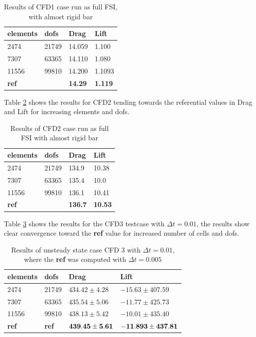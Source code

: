 \begin{table}[H]
\centering
\caption{Results of CFD1 case run as full FSI, with almost rigid bar}
\label{tab:CFD1}
\begin{tabular}{|l|l|l|l|}
\hline
\textbf{elements} & \textbf{dofs} & \textbf{Drag} & \textbf{Lift} \\ \hline
2474 & 21749 & 14.059 & 1.100 \\ \hline
7307 & 63365 & 14.110 & 1.080 \\ \hline
11556 & 99810 & 14.200 & 1.1093 \\ \hline
\textbf{ref} & \textbf{} & \textbf{14.29} & \textbf{1.119} \\ \hline
\end{tabular}
\end{table}

Table \ref{tab:CFD2} shows the results for CFD2 tending towards the referential values in Drag and Lift for increasing elements and dofs.

\begin{table}[H]
\centering
\caption{Results of CFD2 case run as full FSI with almost rigid bar}
\label{tab:CFD2}
\begin{tabular}{|l|l|l|l|}
\hline
\textbf{elements} & \textbf{dofs} & \textbf{Drag} & \textbf{Lift} \\ \hline
2474 & 21749 & 134.9 & 10.38 \\ \hline
7307 & 63365 & 135.4 & 10.0 \\ \hline
11556 & 99810 & 136.1 & 10.41 \\ \hline
\textbf{ref} & \textbf{} & \textbf{136.7} & \textbf{10.53} \\ \hline
\end{tabular}
\end{table}

Table \ref{CFD3_dt001} shows the results for the CFD3 testcase with $\Delta t = 0.01$, the results show clear convergence toward the \textbf{ref} value for increased number of cells and dofs.

\begin{table}[H]
\centering
\label{CFD3_dt001}
\begin{tabular}{|l|l|l|l|}
\hline
\textbf{elements} & \textbf{dofs} & \textbf{Drag} & \textbf{Lift} \\ \hline
2474 & 21749 & $434.42 \pm 4.28$ & $-15.63 \pm 407.59$ \\ \hline
7307 & 63365 & $435.54 \pm 5.06$ & $-11.77 \pm 425.73$ \\ \hline
11556 & 99810 & $438.13 \pm 5.42$ & $ -10.01 \pm 435.40 $ \\ \hline
\textbf{ref} & \textbf{ref} & $\bold{439.45} \pm \bold{5.61 }$ & $\bold{ -11.893} \pm \bold{437.81 }$ \\ \hline
\end{tabular}
\caption{Results of unsteady state case CFD 3 with $\Delta t = 0.01$, where the \textbf{ref} was computed with $\Delta t = 0.005$}
\end{table}

